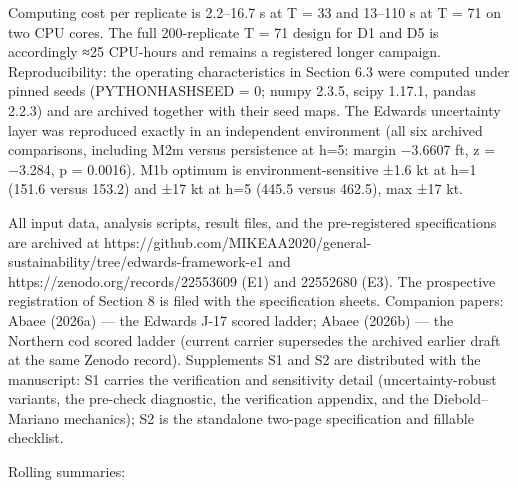 \documentclass[11pt]{article}
\begin{document}
Computing cost per replicate is 2.2--16.7 s at T = 33 and 13--110 s at T
= 71 on two CPU cores. The full 200-replicate T = 71 design for D1 and
D5 is accordingly ≈25 CPU-hours and remains a registered longer
campaign. Reproducibility: the operating characteristics in Section 6.3
were computed under pinned seeds (PYTHONHASHSEED = 0; numpy 2.3.5, scipy
1.17.1, pandas 2.2.3) and are archived together with their seed maps.
The Edwards uncertainty layer was reproduced exactly in an independent
environment (all six archived comparisons, including M2m versus
persistence at h=5: margin −3.6607 ft, z = −3.284, p = 0.0016). M1b
optimum is environment-sensitive ±1.6 kt at h=1 (151.6 versus 153.2) and
±17 kt at h=5 (445.5 versus 462.5), max ±17 kt.

All input data, analysis scripts, result files, and the pre-registered
specifications are archived at
https://github.com/MIKEAA2020/general-sustainability/tree/edwards-framework-e1
and https://zenodo.org/records/22553609 (E1) and 22552680 (E3). The
prospective registration of Section 8 is filed with the specification
sheets. Companion papers: Abaee (2026a) --- the Edwards J-17 scored
ladder; Abaee (2026b) --- the Northern cod scored ladder (current
carrier supersedes the archived earlier draft at the same Zenodo
record). Supplements S1 and S2 are distributed with the manuscript: S1
carries the verification and sensitivity detail (uncertainty-robust
variants, the pre-check diagnostic, the verification appendix, and the
Diebold--Mariano mechanics); S2 is the standalone two-page specification
and fillable checklist.

Rolling summaries:
\end{document}

